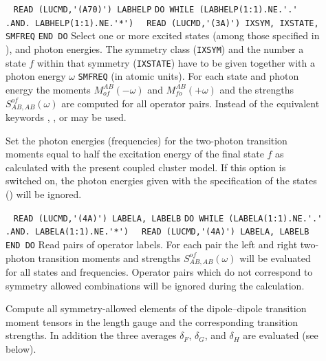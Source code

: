\begin{description}
%
\item[] \verb| | \newline
\verb|READ (LUCMD,'(A70)') LABHELP|\newline
\verb|DO WHILE (LABHELP(1:1).NE.'.' .AND. LABHELP(1:1).NE.'*')|\newline
\verb|  READ (LUCMD,'(3A)') IXSYM, IXSTATE, SMFREQ|\newline
\verb|END DO| \newline
Select one or more excited states (among those specified
in ), and photon energies.
The symmetry class (\verb+IXSYM+) and the number a state $f$
within that symmetry (\verb+IXSTATE+) have to be given
together with a photon energy $\omega$ \verb+SMFREQ+ (in atomic units).
For each state and photon energy the moments 
$M^{AB}_{of}(-\omega)$ and $M^{AB}_{fo}(+\omega)$ and the
strengths $S^{of}_{AB,AB}(\omega)$ are computed for all operator pairs.
Instead of  the equivalent keywords ,
, or  may be used.
%
\item[] 
Set the photon energies (frequencies) for the two-photon transition moments
equal to  half the excitation energy of the final state $f$
as calculated with the present coupled cluster model.
If this option is switched on, the photon energies given with the
specification of the states () will be ignored.
%
\item[] \verb| |\newline
\verb|READ (LUCMD,'(4A)') LABELA, LABELB|\newline
\verb|DO WHILE (LABELA(1:1).NE.'.' .AND. LABELA(1:1).NE.'*')|\newline
\verb|  READ (LUCMD,'(4A)') LABELA, LABELB|\newline
\verb|END DO|\newline
Read pairs of operator labels.
For each pair the left and right two-photon transition moments
and strengths $S^{of}_{AB,AB}(\omega)$ will be evaluated 
for all states and frequencies.
Operator pairs which do not correspond to symmetry allowed
combinations will be ignored during the calculation.
%
\item[] 
Compute all symmetry-allowed elements of the dipole--dipole 
transition moment tensors in the length gauge
and the corresponding transition strengths.
In addition the three averages $\delta_F$, $\delta_G$, and $\delta_H$
are evaluated (see below).
%
\item[]

\end{description}
